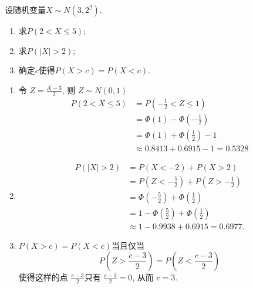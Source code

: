 \documentclass[../main.tex]{subfiles}
\begin{document}
\begin{exercise}{}{}
设随机变量$X \sim N(3,2^2)$.

\begin{enumerate}
\item 求$P(2<X\leqslant 5)$;
\item 求$P(|X|>2)$;
\item 确定$c$使得$P(X>c)=P(X<c)$.
\end{enumerate}
\end{exercise}
\begin{solution}
  \begin{enumerate}
    \item 令 \(  Z= \frac{X-3 }{2 }   \), 则 \(  Z\sim N\left( 0,1 \right)   \) \[
    \begin{aligned}
    P\left( 2< X\le 5 \right)&=  P\left( -\frac{1 }{2 }< Z\le 1  \right) \\ 
     &= \Phi \left( 1 \right)-\Phi \left(-\frac{1 }{2 }  \right)\\ 
      &= \Phi \left( 1 \right)+ \Phi \left( \frac{1 }{2 }  \right)-1 \\ 
       &\approx 0.8413 + 0.6915 - 1 = 0.5328
    \end{aligned}    
    \] 
    \item \[
   \begin{aligned}
    P\left( \left| X \right|> 2  \right)&= P\left( X< -2 \right)+ P\left( X> 2 \right)\\ 
     &= P\left( Z< -\frac{5 }{2 }  \right)+ P\left( Z>  -\frac{1 }{2 }  \right)     \\ 
      &=  \Phi \left( -\frac{5 }{2 }  \right)+ \Phi \left( \frac{1 }{2 }  \right)\\ 
       &= 1-\Phi \left( \frac{5 }{2 }  \right)+ \Phi \left( \frac{1 }{2 }  \right)    \\ 
        &\approx 1 - 0.9938 + 0.6915 = 0.6977.
   \end{aligned}
    \]
    \item  \(  P\left( X> c \right)= P\left( X< c \right)    \)当且仅当 \[
    P\left( Z> \frac{c-3 }{2 }  \right)= P\left( Z< \frac{c-3 }{2 }  \right)  
    \] 使得这样的点 \(  \frac{c-3 }{2 }   \)只有 \(  \frac{c-3 }{2 }= 0   \), 从而 \(  c= 3  \).   
  \end{enumerate}
  
\end{solution}
\end{document}
